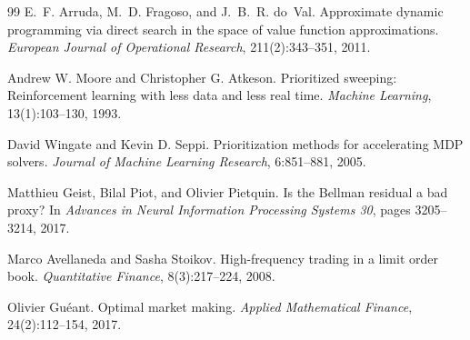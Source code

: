 \documentclass{article}
\begin{document}
\begin{thebibliography}{99}
E.~F. Arruda, M.~D. Fragoso, and J.~B.~R. do~Val.
\newblock Approximate dynamic programming via direct search in the space of
  value function approximations.
\newblock \emph{European Journal of Operational Research}, 211(2):343--351,
  2011.

Andrew W. Moore and Christopher G. Atkeson.
\newblock Prioritized sweeping: Reinforcement learning with less data and less
  real time.
\newblock \emph{Machine Learning}, 13(1):103--130, 1993.

David Wingate and Kevin D. Seppi.
\newblock Prioritization methods for accelerating {MDP} solvers.
\newblock \emph{Journal of Machine Learning Research}, 6:851--881, 2005.

Matthieu Geist, Bilal Piot, and Olivier Pietquin.
\newblock Is the Bellman residual a bad proxy?
\newblock In \emph{Advances in Neural Information Processing Systems 30}, pages
  3205--3214, 2017.

Marco Avellaneda and Sasha Stoikov.
\newblock High-frequency trading in a limit order book.
\newblock \emph{Quantitative Finance}, 8(3):217--224, 2008.

Olivier Gu\'eant.
\newblock Optimal market making.
\newblock \emph{Applied Mathematical Finance}, 24(2):112--154, 2017.

\end{thebibliography}
\end{document}
